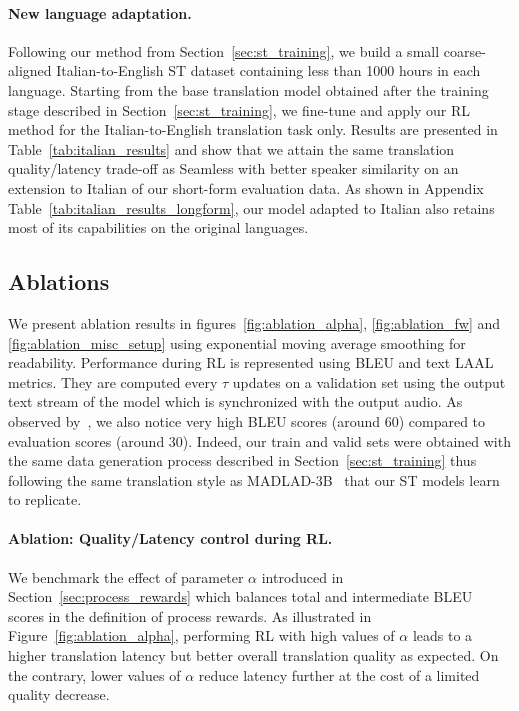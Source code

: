 \paragraph{New language adaptation.}
\label{sec:new_lang_results}
Following our method from Section~\ref{sec:st_training}, we build a small coarse-aligned Italian-to-English ST dataset containing less than 1000 hours in each language. Starting from the base translation model obtained after the training stage described in Section~\ref{sec:st_training}, we fine-tune and apply our RL method for the Italian-to-English translation task only. Results are presented in Table~\ref{tab:italian_results} and show that we attain the same translation quality/latency trade-off as Seamless with better speaker similarity on an extension to Italian of our short-form evaluation data. As shown in Appendix Table~\ref{tab:italian_results_longform}, our model adapted to Italian also retains most of its capabilities on the original languages.


\subsection{Ablations}
\label{sec:ablations}

We present ablation results in figures~\ref{fig:ablation_alpha}, \ref{fig:ablation_fw} and \ref{fig:ablation_misc_setup} using exponential moving average smoothing for readability. Performance during RL is represented using BLEU and text LAAL metrics. They are computed every $\tau$ updates on a validation set using the output text stream of the model which is synchronized with the output audio. As observed by~\citet{hibiki}, we also notice very high BLEU scores (around 60) compared to evaluation scores (around 30). Indeed, our train and valid sets were obtained with the same data generation process described in Section~\ref{sec:st_training} thus following the same translation style as MADLAD-3B~\citep{madlad} that our ST models learn to replicate.

\paragraph{Ablation: Quality/Latency control during RL.}
\label{sec:ablation_alpha}
We benchmark the effect of parameter $\alpha$ introduced in Section~\ref{sec:process_rewards} which balances total and intermediate BLEU scores in the definition of process rewards. As illustrated in Figure~\ref{fig:ablation_alpha}, performing RL with high values of $\alpha$ leads to a higher translation latency but better overall translation quality as expected. On the contrary, lower values of $\alpha$ reduce latency further at the cost of a limited quality decrease.


